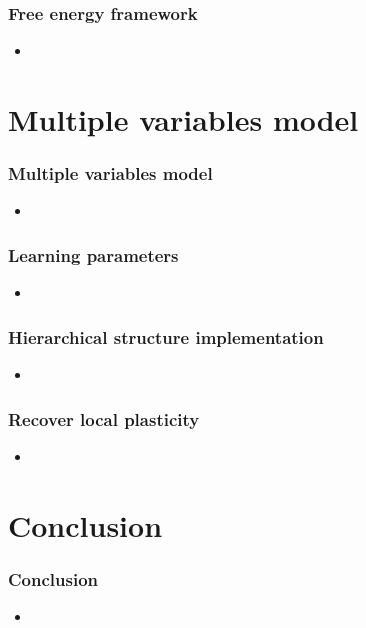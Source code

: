 \documentclass[aspectratio=43]{beamer}
\begin{document}
\begin{frame}
  \frametitle{Free energy framework}
  \begin{itemize}
    \item %
  \end{itemize}
\end{frame}



\section{Multiple variables model}
\begin{frame}
  \frametitle{Multiple variables model}
  \begin{itemize}
    \item %
  \end{itemize}
\end{frame}

\begin{frame}
  \frametitle{Learning parameters}
  \begin{itemize}
    \item %
  \end{itemize}
\end{frame}

\begin{frame}
  \frametitle{Hierarchical structure implementation}
  \begin{itemize}
    \item %
  \end{itemize}
\end{frame}

\begin{frame}
  \frametitle{Recover local plasticity}
  \begin{itemize}
    \item %
  \end{itemize}
\end{frame}




\section{Conclusion}
\begin{frame}
  \frametitle{Conclusion}
  \begin{itemize}
    \item %
  \end{itemize}
\end{frame}
\end{document}
